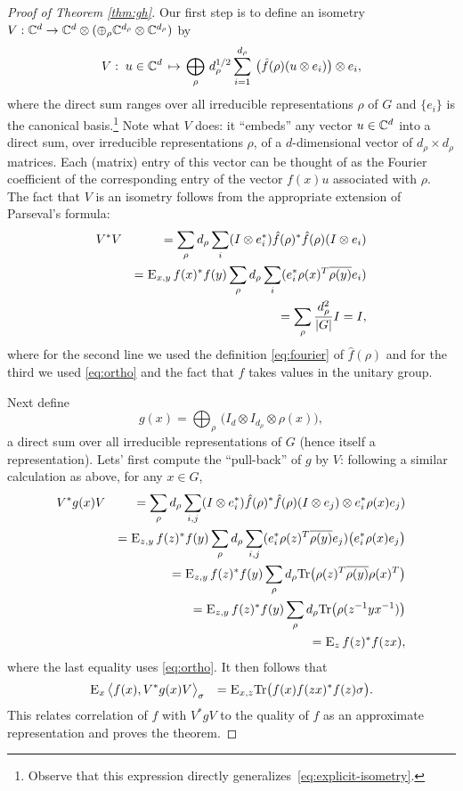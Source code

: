 \begin{proof}[Proof of Theorem \ref{thm:gh}]
Our first step is to define an isometry $V:\mathbb{C}^d \to \mathbb{C}^d \otimes (\oplus_\rho \mathbb{C}^{d_\rho} \otimes \mathbb{C}^{d_\rho})$ by
$$ V :\;u \in \mathbb{C}^d \,\mapsto\, \bigoplus_\rho \,d_\rho^{1/2} \sum_{i=1}^{d_\rho} \,\big(\hat{f}(\rho) (u\otimes e_i)\big) \otimes e_i,$$
where the direct sum ranges over all irreducible representations $\rho$ of $G$ and $\{e_i\}$ is the canonical basis.\footnote{Observe that this expression directly generalizes~\eqref{eq:explicit-isometry}.}
Note what $V$ does: it ``embeds'' any vector $u\in \mathbb{C}^d$ into a direct sum, over irreducible representations $\rho$, of a $d$-dimensional vector of $d_\rho\times d_\rho$ matrices. Each (matrix) entry of this vector can be thought of as the Fourier coefficient of the corresponding entry of the vector $f(x)u$ associated with $\rho$. 
The fact that $V$ is an isometry follows from the appropriate extension of Parseval's formula:  
\begin{eqnarray*}
& V^* V &= \sum_\rho d_\rho \sum_i (I\otimes e_i^*) \hat{f}(\rho)^*\hat{f}(\rho) (I\otimes e_i)\\
&&= \textsc{E}_{x,y}\,  f(x)^*f(y) \sum_\rho d_\rho \sum_i  (e_i^* \rho(x)^T \overline{\rho(y)} e_i)\\
&&= \sum_\rho \frac{d_\rho^2}{|G|}I = I,
\end{eqnarray*}
where for the second line we used the definition \eqref{eq:fourier} of $\hat{f}(\rho)$ and  for the third we used \eqref{eq:ortho} and the fact that $f$ takes values in the unitary group.

Next define
$$g(x) = \bigoplus_\rho \,\big(I_d \otimes I_{d_\rho} \otimes \rho(x)\big), $$
a direct sum over all irreducible representations of $G$ (hence itself a representation). Lets' first compute the ``pull-back'' of $g$ by $V$: following a similar calculation as above, for any $x\in G$, 
\begin{eqnarray*}
& V^*g(x) V  &=  \sum_{\rho}  d_\rho \sum_{i,j} (I\otimes e_i^*)\hat{f}(\rho)^* \hat{f}(\rho)(I\otimes e_j) \otimes e_i^* \rho(x) e_j ) \\
&& =  \textsc{E}_{z,y}\,  f(z)^*f(y)  \sum_{\rho}  d_\rho \sum_{i,j} (e_i^* \rho(z)^T \overline{\rho(y)} e_j) \big( e_i^* \rho(x) e_j \big) \\
&& =  \textsc{E}_{z,y}\,  f(z)^*f(y)  \sum_{\rho}  d_\rho \mathrm{Tr}\big( \rho(z)^T \overline{\rho(y)}  {\rho(x)^T} \big) \\
&& =  \textsc{E}_{z,y}\,  f(z)^*f(y)  \sum_{\rho}  d_\rho \mathrm{Tr}\big( \rho(z^{-1}y x^{-1}) \big) \\
&& =  \textsc{E}_{z}\,  f(z)^*f(zx) , 
\end{eqnarray*}
where the last equality uses \eqref{eq:ortho}.
It then follows that 
\begin{eqnarray*}
&\textsc{E}_{x}\, \big\langle f(x), V^*g(x) V \big\rangle_\sigma &=  \textsc{E}_{x,z} \mathrm{Tr}\big( f(x) f(zx)^* f(z)\sigma\big).
\end{eqnarray*}  
This relates correlation of $f$ with $V^*gV$ to the quality of $f$ as an approximate representation and proves the theorem. 
\end{proof}

